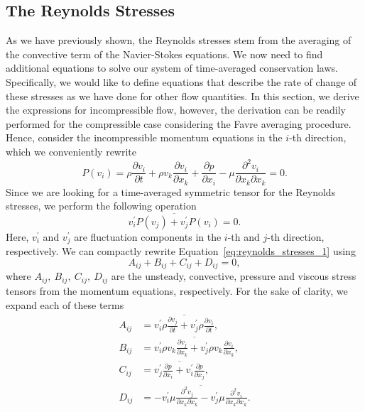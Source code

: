 \subsection{The Reynolds Stresses}
As we have previously shown, the Reynolds stresses stem from the averaging of the convective term of the Navier-Stokes equations. We now need to find additional equations to solve our system of time-averaged conservation laws. Specifically, we would like to define equations that describe the rate of change of these stresses as we have done for other flow quantities. In this section, we derive the expressions for incompressible flow, however, the derivation can be readily performed for the compressible case considering the Favre averaging procedure. Hence, consider the incompressible momentum equations in the $i$-th direction, which we conveniently rewrite 
\begin{equation}
	P(v_i) 
	= \rho \frac{\partial v_i}{\partial t}
	+ \rho v_k\frac{\partial v_i}{\partial x_k}
	+ \frac{\partial p}{\partial x_i} 
	- \mu \frac{\partial^2 v_i}{\partial x_k \partial x_k} =0.
\end{equation}
Since we are looking for a time-averaged symmetric tensor for the Reynolds stresses, we perform the following operation
\begin{equation}
	\overline{v_i^\prime P(v_j) + v_j^\prime P(v_i)}=0.
	\label{eq:reynolds_stresses_1}
\end{equation}
Here, $v_i^\prime$ and $v_j^\prime$ are fluctuation components in the $i$-th and $j$-th direction, respectively. We can compactly rewrite Equation~\ref{eq:reynolds_stresses_1} using
\begin{equation}
	A_{ij} + B_{ij} + C_{ij} + D_{ij} = 0,
\end{equation}
where $A_{ij},~B_{ij},~C_{ij},~D_{ij}$ are the unsteady, convective, pressure and viscous stress tensors from the momentum equations, respectively. For the sake of clarity, we expand each of these terms
\begin{align}
	A_{ij} &= \overline{v_i^\prime\rho\frac{\partial v_j}{\partial t} + v_j^\prime\rho\frac{\partial v_i}{\partial t}},\\
	B_{ij} &= \overline{v_i^\prime\rho v_k\frac{\partial v_j}{\partial x_k} + v_j^\prime\rho v_k\frac{\partial v_i}{\partial x_k}},\\
	C_{ij} &= \overline{v_j^\prime\frac{\partial p}{\partial x_i} + v_i^\prime\frac{\partial p}{\partial x_j}}, \\
	D_{ij} &= \overline{-v_i^\prime\mu\frac{\partial^2 v_j}{\partial x_k\partial x_k}-v_j^\prime\mu\frac{\partial^2 v_i}{\partial x_k\partial x_k}}.
\end{align}
